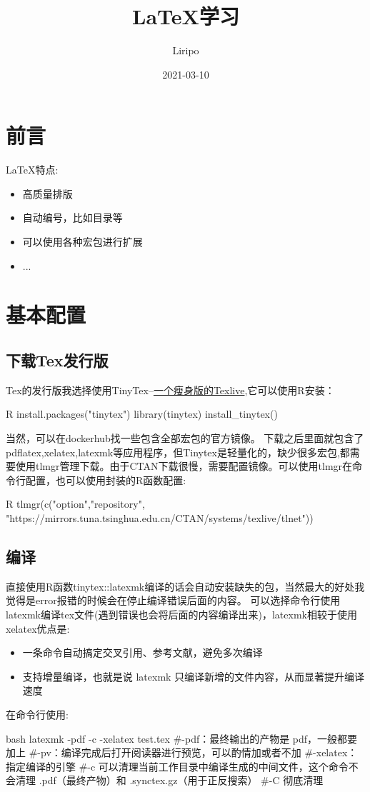 \documentclass[UTF8,a4paper,12pt]{ctexart} %
\def\facog{\small\faIcon{cog}}
\begin{document}
\title{\LaTeX 学习}
\author{Liripo}
\date{2021-03-10}
\maketitle %
\tableofcontents
\section*{前言}
\LaTeX 特点:
\begin{itemize}
  \item 高质量排版
  \item 自动编号，比如目录等
  \item 可以使用各种宏包进行扩展
  \item ...
\end{itemize}
\section{\protect\facog 基本配置}
\subsection{下载Tex发行版} 
Tex的发行版我选择使用TinyTex--\href{https://yihui.org/tinytex/cn/aaaaaaaaaaaaaa}{一个瘦身版的Texlive},它可以使用R安装：
\begin{lang}{R}
install.packages("tinytex")
library(tinytex)
install_tinytex()
\end{lang}
当然，可以在dockerhub找一些包含全部宏包的官方镜像。
\indent 下载之后里面就包含了pdflatex,xelatex,latexmk等应用程序，但Tinytex是轻量化的，缺少很多宏包,都需要使用tlmgr管理下载。由于CTAN下载很慢，需要配置镜像。可以使用tlmgr在命令行配置，也可以使用封装的R函数配置:
\begin{lang}{R}
tlmgr(c("option","repository",
  "https://mirrors.tuna.tsinghua.edu.cn/CTAN/systems/texlive/tlnet"))
\end{lang}
\subsection{编译}
直接使用R函数tinytex::latexmk编译的话会自动安装缺失的包，当然最大的好处我觉得是error报错的时候会在停止编译错误后面的内容。
可以选择命令行使用latexmk编译tex文件(遇到错误也会将后面的内容编译出来)，latexmk相较于使用xelatex优点是:
\begin{itemize}
	\item 一条命令自动搞定交叉引用、参考文献，避免多次编译
 	\item 支持增量编译，也就是说 latexmk 只编译新增的文件内容，从而显著提升编译速度
\end{itemize}
在命令行使用:
\begin{lang}{bash}
latexmk -pdf -c -xelatex test.tex
#-pdf：最终输出的产物是 pdf，一般都要加上
#-pv：编译完成后打开阅读器进行预览，可以酌情加或者不加
#-xelatex：指定编译的引擎
#-c 可以清理当前工作目录中编译生成的中间文件，这个命令不会清理 .pdf（最终产物）和 .synctex.gz（用于正反搜索）
#-C 彻底清理
\end{lang}
\end{document}
